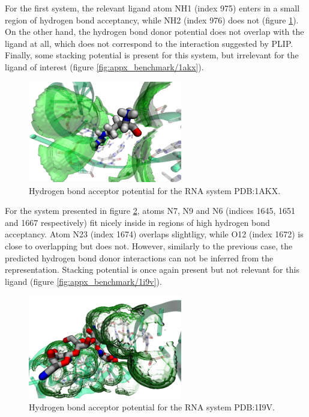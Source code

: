     For the first system, the relevant ligand atom NH1 (index 975) enters in a small region of hydrogen bond acceptancy, while NH2 (index 976) does not (figure \ref{fig:benchmark/1akx}). On the other hand, the hydrogen bond donor potential does not overlap with the ligand at all, which does not correspond to the interaction suggested by PLIP. Finally, some stacking potential is present for this system, but irrelevant for the ligand of interest (figure \ref{fig:appx_benchmark/1akx}).

    \begin{figure}[H]
      \centering
      \includegraphics[width=0.6\textwidth]{figures/results/benchmark_rna/1akx.png}
      \caption{\label{fig:benchmark/1akx} Hydrogen bond acceptor potential for the RNA system PDB:1AKX.}
    \end{figure}

    For the system presented in figure \ref{fig:benchmark/1i9v}, atoms N7, N9 and N6 (indices 1645, 1651 and 1667 respectively) fit nicely inside in regions of high hydrogen bond acceptancy. Atom N23 (index 1674) overlaps slightligy, while O12 (index 1672) is close to overlapping but does not. However, similarly to the previous case, the predicted hydrogen bond donor interactions can not be inferred from the representation. Stacking potential is once again present but not relevant for this ligand (figure \ref{fig:appx_benchmark/1i9v}).

    \begin{figure}[H]
      \centering
      \includegraphics[width=0.6\textwidth]{figures/results/benchmark_rna/1i9v.png}
      \caption{\label{fig:benchmark/1i9v} Hydrogen bond acceptor potential for the RNA system PDB:1I9V.}
    \end{figure}

